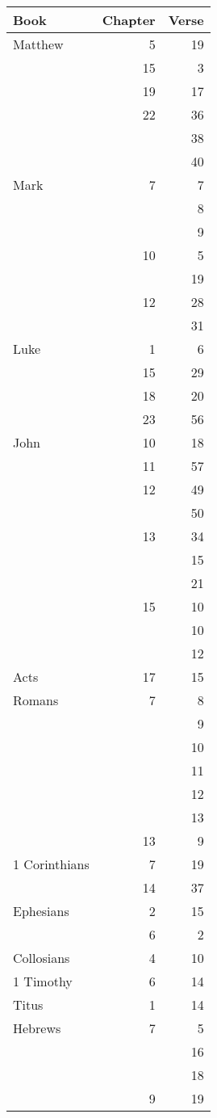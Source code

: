 \documentclass{article}
\begin{document}
\begin{longtable}{lrr}
    \toprule
    Book & Chapter & Verse \\
    \midrule
    Matthew & 5 & 19 \\
    &15&3\\
    &19&17\\
    &22&36\\
    & &38\\
    & &40\\
    Mark&7&7\\
    & &8\\
    & &9\\
    &10&5\\
    & &19\\
    &12&28\\
    & &31\\
    Luke&1&6\\
    &15&29\\
    &18&20\\
    &23&56\\
    John&10&18\\
    &11&57\\
    &12&49\\
    & &50\\
    &13&34\\
    & &15\\
    & &21\\
    &15&10\\
    & &10\\
    & &12\\
    Acts&17&15\\
    Romans&7&8\\
    & &9\\
    & &10\\
    & &11\\
    & &12\\
    & &13\\
    &13&9\\
    1 Corinthians&7&19\\
    &14&37\\
    Ephesians&2&15\\
    &6&2\\
    Collosians&4&10\\
    1 Timothy&6&14\\
    Titus&1&14\\
    Hebrews&7&5\\
    & &16\\
    & &18\\
    &9&19\\

\end{longtable}
\end{document}
